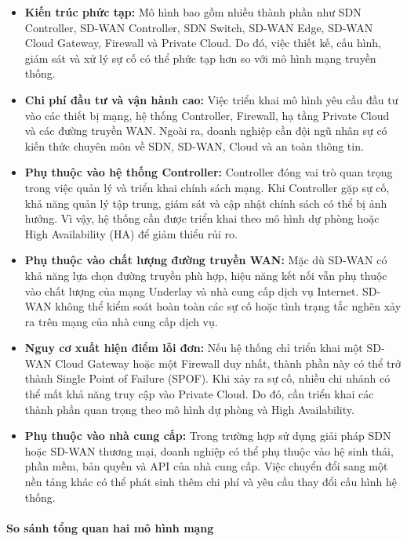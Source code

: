 \begin{itemize}
    \item \textbf{Kiến trúc phức tạp:} 
    Mô hình bao gồm nhiều thành phần như SDN Controller, SD-WAN Controller, SDN Switch, SD-WAN Edge, SD-WAN Cloud Gateway, Firewall và Private Cloud. Do đó, việc thiết kế, cấu hình, giám sát và xử lý sự cố có thể phức tạp hơn so với mô hình mạng truyền thống.

    \item \textbf{Chi phí đầu tư và vận hành cao:} 
    Việc triển khai mô hình yêu cầu đầu tư vào các thiết bị mạng, hệ thống Controller, Firewall, hạ tầng Private Cloud và các đường truyền WAN. Ngoài ra, doanh nghiệp cần đội ngũ nhân sự có kiến thức chuyên môn về SDN, SD-WAN, Cloud và an toàn thông tin.

    \item \textbf{Phụ thuộc vào hệ thống Controller:} 
    Controller đóng vai trò quan trọng trong việc quản lý và triển khai chính sách mạng. Khi Controller gặp sự cố, khả năng quản lý tập trung, giám sát và cập nhật chính sách có thể bị ảnh hưởng. Vì vậy, hệ thống cần được triển khai theo mô hình dự phòng hoặc High Availability (HA) để giảm thiểu rủi ro.

    \item \textbf{Phụ thuộc vào chất lượng đường truyền WAN:} 
    Mặc dù SD-WAN có khả năng lựa chọn đường truyền phù hợp, hiệu năng kết nối vẫn phụ thuộc vào chất lượng của mạng Underlay và nhà cung cấp dịch vụ Internet. SD-WAN không thể kiểm soát hoàn toàn các sự cố hoặc tình trạng tắc nghẽn xảy ra trên mạng của nhà cung cấp dịch vụ.

    \item \textbf{Nguy cơ xuất hiện điểm lỗi đơn:} 
    Nếu hệ thống chỉ triển khai một SD-WAN Cloud Gateway hoặc một Firewall duy nhất, thành phần này có thể trở thành Single Point of Failure (SPOF). Khi xảy ra sự cố, nhiều chi nhánh có thể mất khả năng truy cập vào Private Cloud. Do đó, cần triển khai các thành phần quan trọng theo mô hình dự phòng và High Availability.

    \item \textbf{Phụ thuộc vào nhà cung cấp:} 
    Trong trường hợp sử dụng giải pháp SDN hoặc SD-WAN thương mại, doanh nghiệp có thể phụ thuộc vào hệ sinh thái, phần mềm, bản quyền và API của nhà cung cấp. Việc chuyển đổi sang một nền tảng khác có thể phát sinh thêm chi phí và yêu cầu thay đổi cấu hình hệ thống.
\end{itemize}
\paragraph{So sánh tổng quan hai mô hình mạng}

